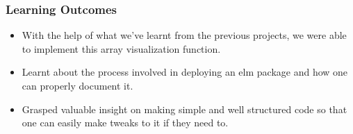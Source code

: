 \begin{FlushLeft}
\subsubsection{Learning Outcomes}
\begin{itemize}
    \item With the help of what we've learnt from the previous projects, we were able to implement this array visualization function. 
    \item Learnt about the process involved in deploying an elm package and how one can properly document it. \item Grasped valuable insight on making simple and well structured code so that one can easily make tweaks to it if they need to. 
\end{itemize}

\end{FlushLeft}